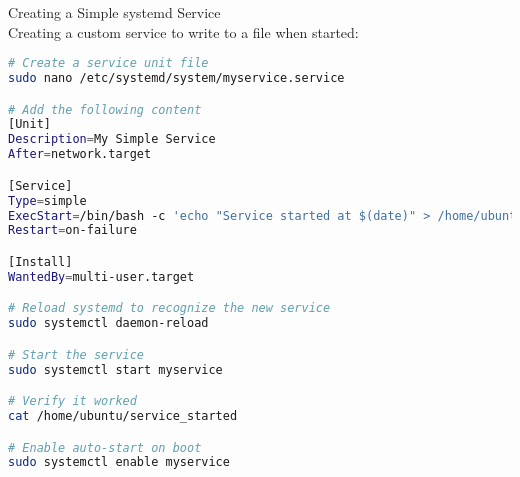 \begin{example2}{Creating a Simple systemd Service}\\
    Creating a custom service to write to a file when started:
    
\begin{lstlisting}[language=bash, style=basesmol]
# Create a service unit file
sudo nano /etc/systemd/system/myservice.service

# Add the following content
[Unit]
Description=My Simple Service
After=network.target

[Service]
Type=simple
ExecStart=/bin/bash -c 'echo "Service started at $(date)" > /home/ubuntu/service_started'
Restart=on-failure

[Install]
WantedBy=multi-user.target

# Reload systemd to recognize the new service
sudo systemctl daemon-reload

# Start the service
sudo systemctl start myservice

# Verify it worked
cat /home/ubuntu/service_started

# Enable auto-start on boot
sudo systemctl enable myservice
\end{lstlisting}
\end{example2}



